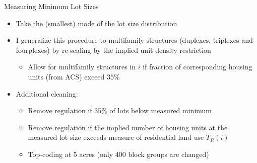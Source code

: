 \documentclass{beamer}
\begin{document}
\begin{frame}{Measuring Minimum Lot Sizes}\label{returnLotSize}
	\begin{itemize}
		\itemsep1em
		\color{black}
		\item Take the (smallest) mode of the lot size distribution \pause
		
		\item I generalize this procedure to multifamily structures (duplexes, triplexes and fourplexes) by re-scaling by the implied unit density restriction 
		\begin{itemize}
		\item Allow for multifamily structures in $i$ if fraction of corresponding housing units (from ACS) exceed $35 \%$ 
		\end{itemize}	
			\pause
		
		\item Additional cleaning:
		\begin{itemize}
			\item Remove regulation if $35 \% $ of lots below measured minimum
			\item Remove regulation if the implied number of housing units at the measured lot size exceeds measure of residential land use $T_{R}(i)$
			\item Top-coding at 5 acres (only 400 block groups are changed)
		
		\end{itemize}	
	
	
	\hyperlink{lotsizecdf}{} 
	\end{itemize}
\end{frame}
\end{document}
